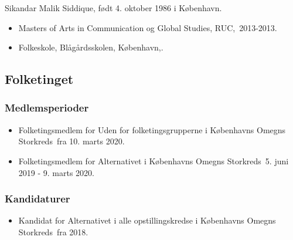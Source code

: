 \documentclass[11pt, a4paper]{awesome-cv}
\begin{document}
\makecvheader[R]
\makelettertitle
\begin{cvletter}
Sikandar Malik Siddique, født 4. oktober 1986 i København. 

\begin{itemize}
\item Masters of Arts in Communication og Global Studies, RUC, 2013-2013.
\item Folkeskole, Blågårdsskolen, København,.
\end{itemize}
\subsection*{Folketinget}
\subsubsection*{Medlemsperioder}
\begin{itemize}
\item Folketingsmedlem for Uden for folketingsgrupperne i Københavns Omegns Storkreds fra 10. marts 2020.
\item Folketingsmedlem for Alternativet i Københavns Omegns Storkreds 5. juni 2019 - 9. marts 2020.
\end{itemize}
\subsubsection*{Kandidaturer}
\begin{itemize}
\item Kandidat for Alternativet i alle opstillingskredse i Københavns Omegns Storkreds fra 2018.
\end{itemize}
\end{cvletter}
\end{document}
